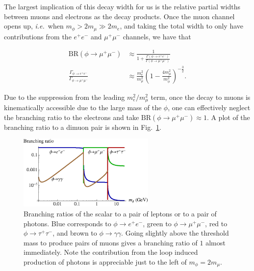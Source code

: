 The largest implication of this decay width for us is the relative partial widths between muons and electrons as the decay products.
Once the muon channel opens up, {\em i.e.}\ when $m_\phi > 2 m_\mu \gg 2 m_e$, and taking the total width to only have contributions from the $e^+ e^-$ and $\mu^+ \mu^-$ channels, we have that

\begin{align}
    \textrm{BR}(\phi \rightarrow \mu^+ \mu^-) &\approx \frac{1}{1+\frac{\Gamma\left(\phi \rightarrow e^+ e^-\right)}{\Gamma\left(\phi \rightarrow \mu^+ \mu^-\right)}} \\
    \frac{\Gamma_{\phi \rightarrow e^+ e^-}}{\Gamma_{\phi \rightarrow \mu^+ \mu^-}} &\approx \frac{m_e^2}{m_\mu^2}\left(1-\frac{4m_\mu^2}{m_\phi^2}\right)^{-\frac{3}{2}}\textrm{.}
\end{align}

\noindent Due to the suppression from the leading $m_e^2/m_\mu^2$ term, once the decay to muons is kinematically accessible due to the large mass of the $\phi$, one can effectively neglect the branching ratio to the electrons and take $\textrm{BR}(\phi \rightarrow \mu^+ \mu^-) \approx 1$.
A plot of the branching ratio to a dimuon pair is shown in Fig.\ \ref{fig:br_phi}.

\begin{figure}[h]
    \centering
    \includegraphics[width = 0.6\textwidth]{Figures/misc/br_phi}
    \caption[Branching ratios of the scalar to a pair of leptons or a pair of photons.]{Branching ratios of the scalar to a pair of leptons or to a pair of photons. Blue corresponds to $\phi \rightarrow e^+ e^-$, green to $\phi \rightarrow \mu^+ \mu^-$, red to $\phi \rightarrow \tau^+ \tau^-$, and brown to $\phi \rightarrow \gamma \gamma$. Going slightly above the threshold mass to produce pairs of muons gives a branching ratio of $1$ almost immediately. Note the contribution from the loop induced production of photons is appreciable just to the left of $m_\phi = 2 m_\mu$.}
    \label{fig:br_phi}
\end{figure}

